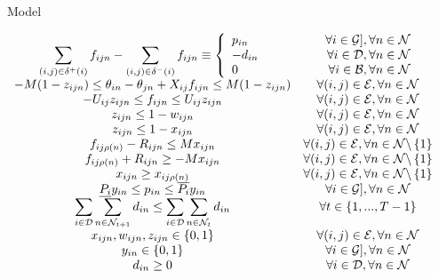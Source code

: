 Model


$
\begin{array}{cc}

\displaystyle\sum_{(i,j) \in \delta^+(i)}f_{ijn} - \sum_{(i,j) \in \delta^-(i)}{f_{ijn}} \equiv  
	\left\{ 
	\begin{array}{l}
			p_{in} \\
			 -d_{in} \\
			 0
	\end{array}
	\right.  
		&
	\begin{array}{r}
			\forall i \in \cG], \forall n \in \cN \\
			 \forall i \in \cD, \forall n \in \cN \\
			\forall i \in \cB, \forall n \in \cN 
	\end{array}\\

 -M(1-z_{ijn}) \le \theta_{in} - \theta_{jn} + X_{ij} f_{ijn} \le M (1-z_{ijn}) 
	& \forall (i,j) \in \cE, \forall n \in \cN  \\

-U_{ij} z_{ijn} \le f_{ijn} \le U_{ij} z_{ijn} 
	&  \forall (i,j) \in \cE, \forall n \in \cN \\

z_{ijn} \le 1-w_{ijn}  
	&  \forall (i,j) \in \cE, \forall n \in \cN \\

z_{ijn} \le 1 - x_{ijn} 
	&  \forall (i,j) \in \cE, \forall n \in \cN \\

f_{ij\rho(n)} - R_{ijn} \le M x_{ijn} 
	&  \forall (i,j) \in \cE, \forall n \in \cN \backslash \left\{ 1 \right\} \\

f_{ij\rho(n)} + R_{ijn} \ge - M x_{ijn} 
	&  \forall (i,j) \in \cE, \forall n \in \cN \backslash \left\{ 1 \right\} \\

x_{ijn} \ge x_{ij\rho(n)}  
	&  \forall (i,j) \in \cE, \forall n \in \cN \backslash \left\{ 1 \right\} \\

\underline{P_i} y_{in} \le p_{in} \le \overline{P_i} y_{in} 
	&  \forall i \in \cG], \forall n \in \cN \\

\displaystyle \sum_{i \in \cD}{ \sum_{n \in \cN_{t+1} }{ d_{in} } }\le \sum_{i \in \cD}{ \sum_{n \in \cN_t }{ d_{in} } } 
	&  \forall t \in \left\{ 1, ..., T-1 \right\}  \\

x_{ijn}, w_{ijn}, z_{ijn} \in \left\{ 0,1 \right\} 	
	&  \forall  (i,j) \in \cE, \forall n \in \cN \\

y_{in} \in \left\{ 0,1 \right\}
	&  \forall  i \in \cG], \forall n \in \cN \\

d_{in} \ge 0 	
	&  \forall  i \in \cD, \forall n \in \cN 

\end{array}
$



